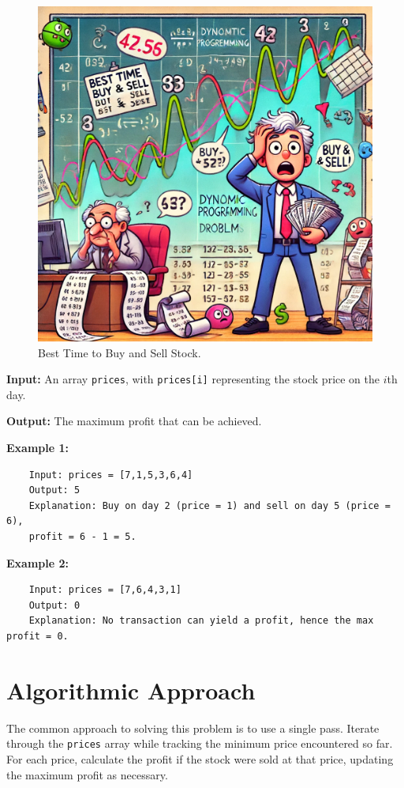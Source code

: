\begin{figure}[h]
  \centering
  \includegraphics[width=\mywidth]{figs/stock}  %
  \caption{Best Time to Buy and Sell Stock.}
\end{figure}

\textbf{Input:} An array \texttt{prices}, with \texttt{prices[i]} representing the stock price on the \(i\)th day.

\textbf{Output:} The maximum profit that can be achieved.

\textbf{Example 1:}
\begin{verbatim}
    Input: prices = [7,1,5,3,6,4]
    Output: 5
    Explanation: Buy on day 2 (price = 1) and sell on day 5 (price = 6), 
    profit = 6 - 1 = 5.
\end{verbatim}

\textbf{Example 2:}
\begin{verbatim}
    Input: prices = [7,6,4,3,1]
    Output: 0
    Explanation: No transaction can yield a profit, hence the max profit = 0.
\end{verbatim}

\section*{Algorithmic Approach}
The common approach to solving this problem is to use a single pass. Iterate through the \texttt{prices} array while tracking the minimum price encountered so far. For each price, calculate the profit if the stock were sold at that price, updating the maximum profit as necessary.


